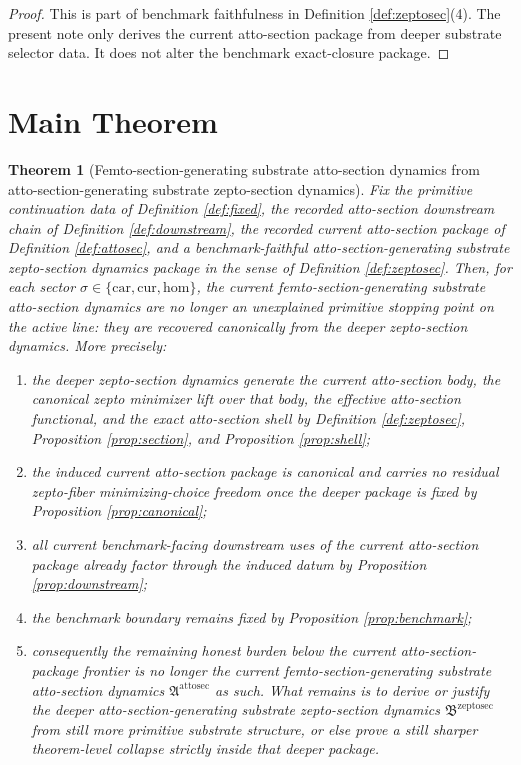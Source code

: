\documentclass[11pt]{article}
\newcommand{\Car}{\mathrm{car}}
\newcommand{\Cur}{\mathrm{cur}}
\newcommand{\Hom}{\mathrm{hom}}
\newcommand{\AttoSectionPackage}{\mathfrak A^{\mathrm{attosec}}}
\newcommand{\ZeptoSectionPackage}{\mathfrak B^{\mathrm{zeptosec}}}
\newtheorem{theorem}{Theorem}
\begin{document}
\begin{proof}
This is part of benchmark faithfulness in Definition \ref{def:zeptosec}(4). The present note only derives the current atto-section package from deeper substrate selector data. It does not alter the benchmark exact-closure package.
\end{proof}

\section{Main Theorem}

\begin{theorem}[Femto-section-generating substrate atto-section dynamics from atto-section-generating substrate zepto-section dynamics]
\label{thm:main}
Fix the primitive continuation data of Definition \ref{def:fixed}, the recorded atto-section downstream chain of Definition \ref{def:downstream}, the recorded current atto-section package of Definition \ref{def:attosec}, and a benchmark-faithful atto-section-generating substrate zepto-section dynamics package in the sense of Definition \ref{def:zeptosec}. Then, for each sector \(\sigma\in\{\Car,\Cur,\Hom\}\), the current femto-section-generating substrate atto-section dynamics are no longer an unexplained primitive stopping point on the active line: they are recovered canonically from the deeper zepto-section dynamics. More precisely:
\begin{enumerate}
    \item the deeper zepto-section dynamics generate the current atto-section body, the canonical zepto minimizer lift over that body, the effective atto-section functional, and the exact atto-section shell by Definition \ref{def:zeptosec}, Proposition \ref{prop:section}, and Proposition \ref{prop:shell};
    \item the induced current atto-section package is canonical and carries no residual zepto-fiber minimizing-choice freedom once the deeper package is fixed by Proposition \ref{prop:canonical};
    \item all current benchmark-facing downstream uses of the current atto-section package already factor through the induced datum by Proposition \ref{prop:downstream};
    \item the benchmark boundary remains fixed by Proposition \ref{prop:benchmark};
    \item consequently the remaining honest burden below the current atto-section-package frontier is no longer the current femto-section-generating substrate atto-section dynamics \(\AttoSectionPackage\) as such. What remains is to derive or justify the deeper atto-section-generating substrate zepto-section dynamics \(\ZeptoSectionPackage\) from still more primitive substrate structure, or else prove a still sharper theorem-level collapse strictly inside that deeper package.
\end{enumerate}
\end{theorem}
\end{document}
